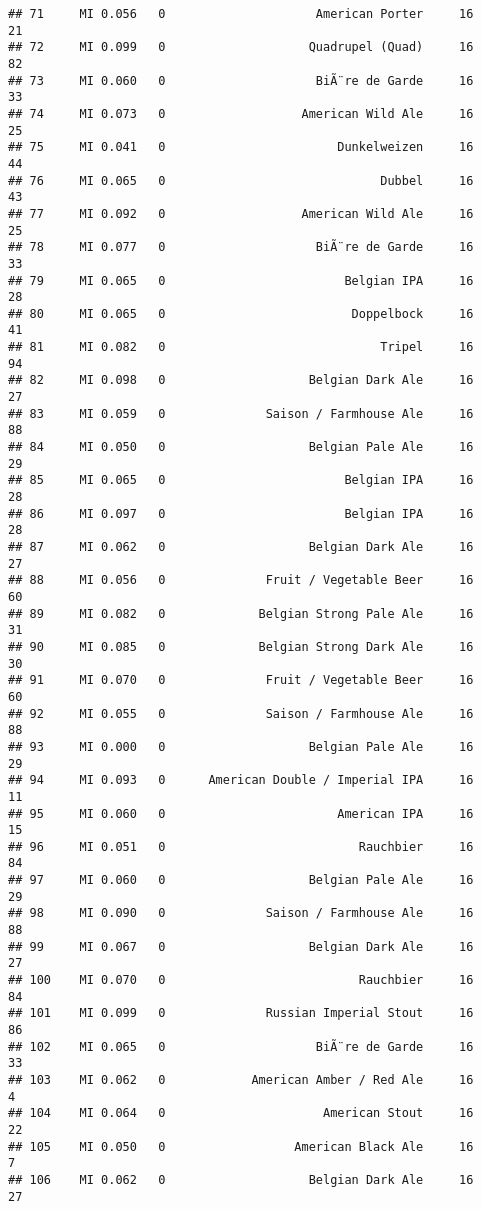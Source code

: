 \documentclass[
]{article}
\begin{document}
\begin{verbatim}
## 71     MI 0.056   0                     American Porter     16      21
## 72     MI 0.099   0                    Quadrupel (Quad)     16      82
## 73     MI 0.060   0                     BiÃ¨re de Garde     16      33
## 74     MI 0.073   0                   American Wild Ale     16      25
## 75     MI 0.041   0                        Dunkelweizen     16      44
## 76     MI 0.065   0                              Dubbel     16      43
## 77     MI 0.092   0                   American Wild Ale     16      25
## 78     MI 0.077   0                     BiÃ¨re de Garde     16      33
## 79     MI 0.065   0                         Belgian IPA     16      28
## 80     MI 0.065   0                          Doppelbock     16      41
## 81     MI 0.082   0                              Tripel     16      94
## 82     MI 0.098   0                    Belgian Dark Ale     16      27
## 83     MI 0.059   0              Saison / Farmhouse Ale     16      88
## 84     MI 0.050   0                    Belgian Pale Ale     16      29
## 85     MI 0.065   0                         Belgian IPA     16      28
## 86     MI 0.097   0                         Belgian IPA     16      28
## 87     MI 0.062   0                    Belgian Dark Ale     16      27
## 88     MI 0.056   0              Fruit / Vegetable Beer     16      60
## 89     MI 0.082   0             Belgian Strong Pale Ale     16      31
## 90     MI 0.085   0             Belgian Strong Dark Ale     16      30
## 91     MI 0.070   0              Fruit / Vegetable Beer     16      60
## 92     MI 0.055   0              Saison / Farmhouse Ale     16      88
## 93     MI 0.000   0                    Belgian Pale Ale     16      29
## 94     MI 0.093   0      American Double / Imperial IPA     16      11
## 95     MI 0.060   0                        American IPA     16      15
## 96     MI 0.051   0                           Rauchbier     16      84
## 97     MI 0.060   0                    Belgian Pale Ale     16      29
## 98     MI 0.090   0              Saison / Farmhouse Ale     16      88
## 99     MI 0.067   0                    Belgian Dark Ale     16      27
## 100    MI 0.070   0                           Rauchbier     16      84
## 101    MI 0.099   0              Russian Imperial Stout     16      86
## 102    MI 0.065   0                     BiÃ¨re de Garde     16      33
## 103    MI 0.062   0            American Amber / Red Ale     16       4
## 104    MI 0.064   0                      American Stout     16      22
## 105    MI 0.050   0                  American Black Ale     16       7
## 106    MI 0.062   0                    Belgian Dark Ale     16      27

\end{verbatim}
\end{document}

